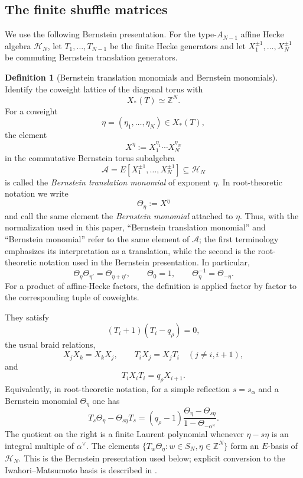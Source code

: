 \documentclass[12pt]{article}
\theoremstyle{definition}
\newtheorem{definition}[theorem]{Definition}
\theoremstyle{remark}
\begin{document}
\subsection{The finite shuffle matrices}


We use the following Bernstein presentation.  For the type-$A_{N-1}$ affine
Hecke algebra $\mathcal H_N$, let $T_1,\ldots,T_{N-1}$ be the finite Hecke
generators and let $X_1^{\pm1},\ldots,X_N^{\pm1}$ be commuting Bernstein
translation generators.

\begin{definition}[Bernstein translation monomials and Bernstein monomials]
\label{def:Bernstein-translation-monomial}
Identify the coweight lattice of the diagonal torus with
\[
 X_*(T)\simeq\mathbb Z^N.
\]
For a coweight
\[
 \eta=(\eta_1,\ldots,\eta_N)\in X_*(T),
\]
the element
\begin{equation}\label{eq:Bernstein-translation-monomial}
 X^\eta
 :=
 X_1^{\eta_1}\cdots X_N^{\eta_N}
\end{equation}
in the commutative Bernstein torus subalgebra
\[
 \mathcal A
 =
 E[X_1^{\pm1},\ldots,X_N^{\pm1}]
 \subseteq \mathcal H_N
\]
is called the \emph{Bernstein translation monomial} of exponent \(\eta\).
In root-theoretic notation we write
\[
 \Theta_\eta:=X^\eta
\]
and call the same element the \emph{Bernstein monomial} attached to
\(\eta\).  Thus, with the normalization used in this paper, ``Bernstein
translation monomial'' and ``Bernstein monomial'' refer to the same element
of \(\mathcal A\); the first terminology emphasizes its interpretation as a
translation, while the second is the root-theoretic notation used in the
Bernstein presentation.  In particular,
\[
 \Theta_\eta\Theta_{\eta'}
 =
 \Theta_{\eta+\eta'},
 \qquad
 \Theta_0=1,
 \qquad
 \Theta_\eta^{-1}=\Theta_{-\eta}.
\]
For a product of affine-Hecke factors, the definition is applied factor by
factor to the corresponding tuple of coweights.
\end{definition}

They satisfy
\[
 (T_i+1)(T_i-q_\rho)=0,
\]
the usual braid relations,
\[
 X_jX_k=X_kX_j,
 \qquad
 T_iX_j=X_jT_i\quad(j\neq i,i+1),
\]
and
\begin{equation}\label{eq:Bernstein-type-A-cross-relation}
 T_iX_iT_i=q_\rho X_{i+1}.
\end{equation}
Equivalently, in root-theoretic notation, for a simple reflection $s=s_\alpha$
and a Bernstein monomial $\Theta_\eta$ one has
\begin{equation}\label{eq:Bernstein-cross-relation-root-form}
 T_s\Theta_\eta-\Theta_{s\eta}T_s
 =(q_\rho-1)
 \frac{\Theta_\eta-\Theta_{s\eta}}
 {1-\Theta_{-\alpha^\vee}}.
\end{equation}
The quotient on the right is a finite Laurent polynomial whenever
$\eta-s\eta$ is an integral multiple of $\alpha^\vee$.  The elements
$\{T_w\Theta_\eta:w\in S_N,\eta\in\mathbb Z^N\}$ form an $E$-basis of
$\mathcal H_N$.  This is the Bernstein presentation used below; explicit
conversion to the Iwahori--Matsumoto basis is described in
\cite{HainesPettet2002}.
\end{document}
